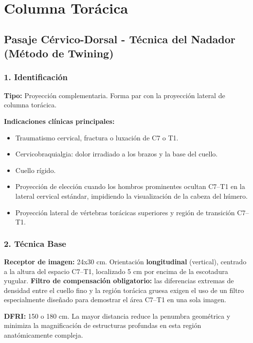 		\section{Columna Torácica}
		
		\subsection{Pasaje Cérvico-Dorsal - Técnica del Nadador (Método de Twining)}
		
		\subsubsection*{1. Identificación}
		
		\textbf{Tipo:} Proyección complementaria. Forma par con la proyección lateral de columna torácica.
		
		\textbf{Indicaciones clínicas principales:}
		\begin{itemize}
			\item Traumatismo cervical, fractura o luxación de C7 o T1.
			\item Cervicobraquialgia: dolor irradiado a los brazos y la base del cuello.
			\item Cuello rígido.
			\item Proyección de elección cuando los hombros prominentes ocultan C7--T1 en la lateral cervical estándar, impidiendo la visualización de la cabeza del húmero.
			\item Proyección lateral de vértebras torácicas superiores y región de transición C7--T1.
		\end{itemize}
		
		\subsubsection*{2. Técnica Base}
		
		\textbf{Receptor de imagen:} 24x30 cm. Orientación \textbf{longitudinal} (vertical), centrado a la altura del espacio C7--T1, localizado 5 cm por encima de la escotadura yugular. \textbf{Filtro de compensación obligatorio:} las diferencias extremas de densidad entre el cuello fino y la región torácica gruesa exigen el uso de un filtro especialmente diseñado para demostrar el área C7--T1 en una sola imagen.
		
		\textbf{DFRI:} 150 o 180 cm. La mayor distancia reduce la penumbra geométrica y minimiza la magnificación de estructuras profundas en esta región anatómicamente compleja.
		
